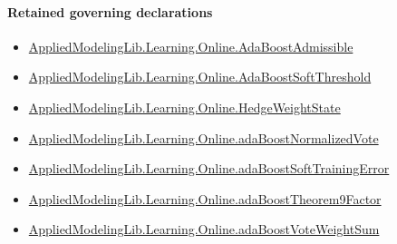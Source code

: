 \documentclass[10pt]{article}
\begin{document}
\paragraph{Retained governing declarations}
\begin{itemize}\raggedright
\item \hyperlink{library-prerequisite-2771987b29f636cf}{Applied\allowbreak{}Modeling\allowbreak{}Lib.\allowbreak{}Learning.\allowbreak{}Online.\allowbreak{}Ada\allowbreak{}Boost\allowbreak{}Admissible}
\item \hyperlink{governing-declaration-d562d355d70c33b0}{Applied\allowbreak{}Modeling\allowbreak{}Lib.\allowbreak{}Learning.\allowbreak{}Online.\allowbreak{}Ada\allowbreak{}Boost\allowbreak{}Soft\allowbreak{}Threshold}
\item \hyperlink{library-prerequisite-8196082d02788389}{Applied\allowbreak{}Modeling\allowbreak{}Lib.\allowbreak{}Learning.\allowbreak{}Online.\allowbreak{}Hedge\allowbreak{}Weight\allowbreak{}State}
\item \hyperlink{governing-declaration-6ef08f7caea78957}{Applied\allowbreak{}Modeling\allowbreak{}Lib.\allowbreak{}Learning.\allowbreak{}Online.\allowbreak{}ada\allowbreak{}Boost\allowbreak{}Normalized\allowbreak{}Vote}
\item \hyperlink{governing-declaration-27eddf5875557626}{Applied\allowbreak{}Modeling\allowbreak{}Lib.\allowbreak{}Learning.\allowbreak{}Online.\allowbreak{}ada\allowbreak{}Boost\allowbreak{}Soft\allowbreak{}Training\allowbreak{}Error}
\item \hyperlink{governing-declaration-7e37ebcbc41fa4e2}{Applied\allowbreak{}Modeling\allowbreak{}Lib.\allowbreak{}Learning.\allowbreak{}Online.\allowbreak{}ada\allowbreak{}Boost\allowbreak{}Theorem9\allowbreak{}Factor}
\item \hyperlink{library-prerequisite-864e76243c68eb36}{Applied\allowbreak{}Modeling\allowbreak{}Lib.\allowbreak{}Learning.\allowbreak{}Online.\allowbreak{}ada\allowbreak{}Boost\allowbreak{}Vote\allowbreak{}Weight\allowbreak{}Sum}
\end{itemize}
\end{document}
